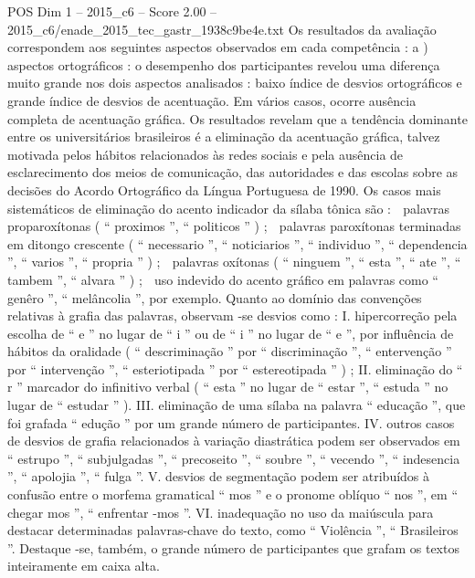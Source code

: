 \begin{textsample}{POS Dim 1 – 2015\_c6 – Score 2.00 – 2015\_c6/enade\_2015\_tec\_gastr\_1938c9be4e.txt}
Os resultados da avaliação correspondem aos seguintes aspectos observados em cada competência : a ) aspectos ortográficos : o desempenho dos participantes revelou uma diferença muito grande nos dois aspectos analisados : baixo índice de desvios ortográficos e grande índice de desvios de acentuação.
Em vários casos, ocorre ausência completa de acentuação gráfica.
Os resultados revelam que a tendência dominante entre os universitários brasileiros é a eliminação da acentuação gráfica, talvez motivada pelos hábitos relacionados às redes sociais e pela ausência de esclarecimento dos meios de comunicação, das autoridades e das escolas sobre as decisões do Acordo Ortográfico da Língua Portuguesa de 1990.
Os casos mais sistemáticos de eliminação do acento indicador da sílaba tônica são :  palavras proparoxítonas ( “ proximos ”, “ politicos ” ) ;  palavras paroxítonas terminadas em ditongo crescente ( “ necessario ”, “ noticiarios ”, “ individuo ”, “ dependencia ”, “ varios ”, “ propria ” ) ;  palavras oxítonas ( “ ninguem ”, “ esta ”, “ ate ”, “ tambem ”, “ alvara ” ) ;  uso indevido do acento gráfico em palavras como “ genêro ”, “ melâncolia ”, por exemplo.
Quanto ao domínio das convenções relativas à grafia das palavras, observam -se desvios como : I. hipercorreção pela escolha de “ e ” no lugar de “ i ” ou de “ i ” no lugar de “ e ”, por influência de hábitos da oralidade ( “ descriminação ” por “ discriminação ”, “ entervenção ” por “ intervenção ”, “ esteriotipada ” por “ estereotipada ” ) ; II. eliminação do “ r ” marcador do infinitivo verbal ( “ esta ” no lugar de “ estar ”, “ estuda ” no lugar de “ estudar ” ).
III. eliminação de uma sílaba na palavra “ educação ”, que foi grafada “ edução ” por um grande número de participantes.
IV. outros casos de desvios de grafia relacionados à variação diastrática podem ser observados em “ estrupo ”, “ subjulgadas ”, “ precoseito ”, “ soubre ”, “ vecendo ”, “ indesencia ”, “ apolojia ”, “ fulga ”.
V. desvios de segmentação podem ser atribuídos à confusão entre o morfema gramatical “ mos ” e o pronome oblíquo “ nos ”, em “ chegar mos ”, “ enfrentar -mos ”.
VI. inadequação no uso da maiúscula para destacar determinadas palavras-chave do texto, como “ Violência ”, “ Brasileiros ”.
Destaque -se, também, o grande número de participantes que grafam os textos inteiramente em caixa alta.

\end{textsample}
